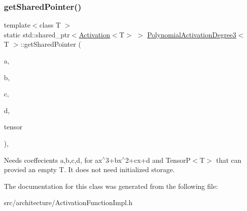 \mbox{\label{classPolynomialActivationDegree3_a667e6e63f1e9e1028facf857c04a6019}} 
\subsubsection{\texorpdfstring{get\+Shared\+Pointer()}{getSharedPointer()}}
{\footnotesize\ttfamily template$<$class T $>$ \\
static std\+::shared\+\_\+ptr$<$\hyperlink{classActivation}{Activation}$<$T$>$ $>$ \hyperlink{classPolynomialActivationDegree3}{Polynomial\+Activation\+Degree3}$<$ T $>$\+::get\+Shared\+Pointer (\begin{DoxyParamCaption}\item[{float}]{a,  }\item[{float}]{b,  }\item[{float}]{c,  }\item[{float}]{d,  }\item[{TensorP$<$ T $>$}]{tensor }\end{DoxyParamCaption})\hspace{0.3cm}{\ttfamily [inline]}, {\ttfamily [static]}}

Needs coeffecients a,b,c,d, for ax$^\wedge$3+bx$^\wedge$2+cx+d and Tensor\+P$<$\+T$>$ that can provied an empty T. It does not need initialized storage. 

The documentation for this class was generated from the following file\+:\begin{DoxyCompactItemize}
\item 
src/architecture/Activation\+Function\+Impl.\+h\end{DoxyCompactItemize}
